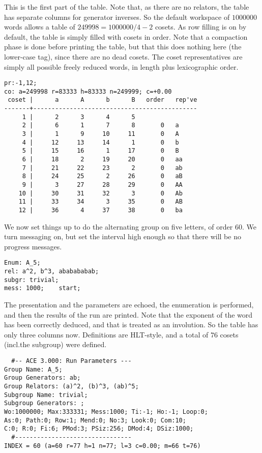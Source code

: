 This is the first part of the table.
Note that, as there are no relators, the table has separate columns for
  generator inverses.
So the default workspace of $1000000$ words allows
  a table of $249998 = 1000000/4 - 2$ cosets.
As row filling is on by default, the table is simply filled with
  cosets in order.
Note that a compaction phase is done before printing the table, but that
  this does nothing here (the lower-case  tag), since there are no 
 dead cosets.
The coset representatives are simply all possible freely reduced words, in
  length plus lexicographic order.

\bv\begin{verbatim}
pr:-1,12;
co: a=249998 r=83333 h=83333 n=249999; c=+0.00
 coset |      a      A      b      B   order   rep've
-------+---------------------------------------------
     1 |      2      3      4      5
     2 |      6      1      7      8       0   a
     3 |      1      9     10     11       0   A
     4 |     12     13     14      1       0   b
     5 |     15     16      1     17       0   B
     6 |     18      2     19     20       0   aa
     7 |     21     22     23      2       0   ab
     8 |     24     25      2     26       0   aB
     9 |      3     27     28     29       0   AA
    10 |     30     31     32      3       0   Ab
    11 |     33     34      3     35       0   AB
    12 |     36      4     37     38       0   ba
\end{verbatim}\ev

We now set things up to do the alternating group on five letters, of order
  $60$.
We turn messaging on, but set the interval high enough so that there will
  be no progress messages.

\bv\begin{verbatim}
Enum: A_5;
rel: a^2, b^3, ababababab;
subgr: trivial;
mess: 1000;    start;
\end{verbatim}\ev

The presentation and the parameters are echoed, the enumeration is
  performed, and then the results of the run are printed.
Note that the exponent of the  word has been correctly
  deduced, and that  is treated as an involution.
So the table has only three columns now.
Definitions are HLT-style, and a total of $76$ cosets (incl.\@ the 
  subgroup) were defined.

\bv\begin{verbatim}
  #-- ACE 3.000: Run Parameters ---
Group Name: A_5;
Group Generators: ab;
Group Relators: (a)^2, (b)^3, (ab)^5;
Subgroup Name: trivial;
Subgroup Generators: ;
Wo:1000000; Max:333331; Mess:1000; Ti:-1; Ho:-1; Loop:0;
As:0; Path:0; Row:1; Mend:0; No:3; Look:0; Com:10;
C:0; R:0; Fi:6; PMod:3; PSiz:256; DMod:4; DSiz:1000;
  #--------------------------------
INDEX = 60 (a=60 r=77 h=1 n=77; l=3 c=0.00; m=66 t=76)
\end{verbatim}\ev

